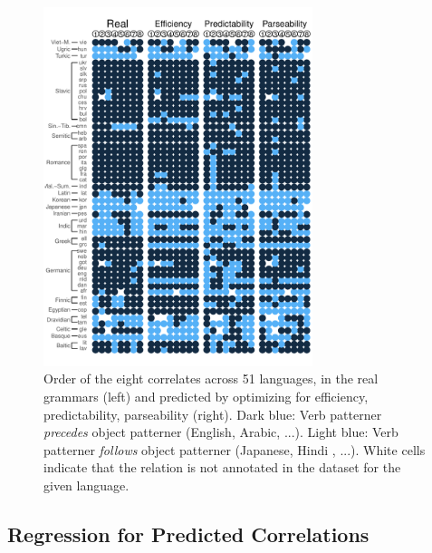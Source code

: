 \documentclass[10pt,twoside,lineno]{article}
\begin{document}
\begin{figure} 
	\begin{center}
	\includegraphics[width=0.7\textwidth]{../results/correlations/figures/pred-eff-pred-pars-families-2.pdf} %
	\end{center}
	\caption{Order of the eight correlates across 51 languages, in the real grammars (left) and predicted by optimizing for efficiency, predictability, parseability (right). Dark blue: Verb patterner \emph{precedes} object patterner (English, Arabic, ...). Light blue: Verb patterner \emph{follows} object patterner (Japanese, Hindi , ...). White cells indicate that the relation is not annotated in the dataset for the given language.}\label{fig:per-lang}
\end{figure}

\subsection{Regression for Predicted Correlations}


\end{document}
